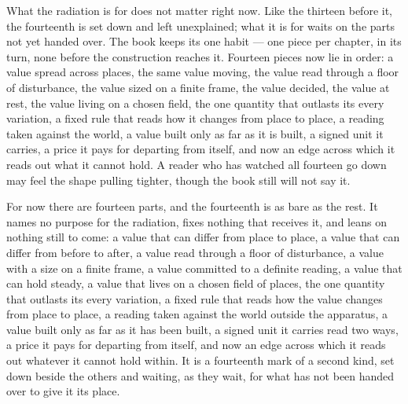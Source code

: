 What the radiation is for does not matter right now. Like the thirteen before it, the fourteenth is set down and left unexplained; what it is for waits on the parts not yet handed over. The book keeps its one habit --- one piece per chapter, in its turn, none before the construction reaches it. Fourteen pieces now lie in order: a value spread across places, the same value moving, the value read through a floor of disturbance, the value sized on a finite frame, the value decided, the value at rest, the value living on a chosen field, the one quantity that outlasts its every variation, a fixed rule that reads how it changes from place to place, a reading taken against the world, a value built only as far as it is built, a signed unit it carries, a price it pays for departing from itself, and now an edge across which it reads out what it cannot hold. A reader who has watched all fourteen go down may feel the shape pulling tighter, though the book still will not say it.

For now there are fourteen parts, and the fourteenth is as bare as the rest. It names no purpose for the radiation, fixes nothing that receives it, and leans on nothing still to come: a value that can differ from place to place, a value that can differ from before to after, a value read through a floor of disturbance, a value with a size on a finite frame, a value committed to a definite reading, a value that can hold steady, a value that lives on a chosen field of places, the one quantity that outlasts its every variation, a fixed rule that reads how the value changes from place to place, a reading taken against the world outside the apparatus, a value built only as far as it has been built, a signed unit it carries read two ways, a price it pays for departing from itself, and now an edge across which it reads out whatever it cannot hold within. It is a fourteenth mark of a second kind, set down beside the others and waiting, as they wait, for what has not been handed over to give it its place.
